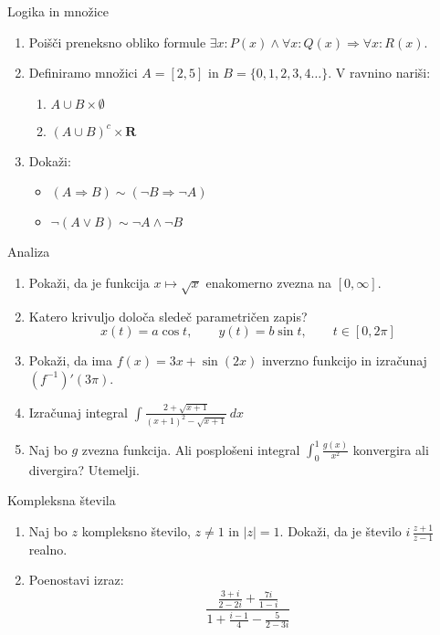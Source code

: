 \begin{frame}{Logika in množice}
	\begin{enumerate}
		\item
		Poišči preneksno obliko formule 
		$\exists x : P(x) \wedge \forall x : Q(x) \Rightarrow \forall x : R(x)$.
		\item 
		Definiramo množici $A = [2,5]$ in $B = \{0,1,2,3,4\dots\}$.
		V ravnino nariši:
		\begin{enumerate}
		   \item $A \cup B \times \emptyset$ 
		   \item $(A \cup B)^c \times \mathbf{R} $
		\end{enumerate}
		\item
		Dokaži:
		\begin{itemize}
			\item $(A \Rightarrow B)\sim (\neg B \Rightarrow \neg A)$
			\item $\neg (A \vee B) \sim \neg A \wedge \neg B$
		\end{itemize}
	\end{enumerate}
\end{frame}

\begin{frame}{Analiza}
	\begin{enumerate}
		\item
		Pokaži, da je funkcija $x \mapsto \sqrt{x}$ enakomerno zvezna na $[0,\infty]$.
		\item 
		Katero krivuljo določa sledeč parametričen zapis?
		$$
		   x(t) = a \cos t, \qquad  %
		   y(t) = b \sin t, \qquad  %
		   t \in [0, 2 \pi]
		$$ 
		\item
		Pokaži, da ima $f(x) = 3x + \sin (2x)$ inverzno funkcijo in izračunaj $(f^{-1})'(3\pi)$.
		
		\item
		Izračunaj integral 
		$\displaystyle \int \frac{2+\sqrt{x+1}}{(x+1)^2-\sqrt{x+1}} \, dx $
		\item 
		Naj bo $g$ zvezna funkcija. Ali posplošeni integral 
		$\int_{0}^{1} \frac{g(x)}{x^2}$
		konvergira ali divergira? Utemelji.
	\end{enumerate}
\end{frame}

\begin{frame}{Kompleksna števila}
	\begin{enumerate}
		\item
		Naj bo $z$ kompleksno število, $z \ne 1$ in $|z|=1$.
		Dokaži, da je število \( i \, \frac{z+1}{z-1} \) realno.
		\item
		Poenostavi izraz:
		$$
		\frac{\frac{3+i}{2-2i} + \frac{7i}{1-i}}{1 + \frac{i-1}{4} - \frac{5}{2-3i}}
		$$
	\end{enumerate}
\end{frame}